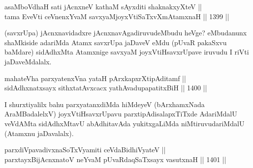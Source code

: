 
\begin{shl}
asaMboVdhaH sati jAcnxneV kathaM sAyxditi shaknakxyXteV || \\
tama EveVti ceV\footnotemark[3]nenxYvaM savxyaMjoyxVtiSaTxvXmAtamxnaH \hfill || 1399 ||  
\end{shl}

\begin{artha}
(savxrUpa) jAcnxnavidadxre jAcnxnavAgadiruvudeMbudu heVge? eMbudanunx shaMkiside adariMda Atamx savxrUpa jaDaveV eMdu (pUvaR pakaSxvu baMdare) sidAdhxMta Atamxnige savxyaM joyxVtiHsavxrUpave iruvudu I riVti jaDaveMdalalx.
\end{artha}

\begin{shl}
\footnotemark[4]mahateVha parxyatenxVna yataH pArxkapxrXtipAditamf ||  \\
sidAdhxnatxsayx sithxtatAvxcacx yathAvadupapatitxBiH \hfill || 1400 ||  
\end{shl}

\begin{artha}
I shurxtiyalilx bahu parxyatanxdiMda hiMdeyeV (bArxhamxNada AraMBadalelxV) joyxVtiHsavxrUpavu parxtipAdisalapxTiTxde AdariMdalU veVdAMta sidAdhxMtavU abAdhitavAda yukitxgaLiMda niMtiruvudariMdalU (Atamxnu jaDavalalx).
\end{artha}


\begin{shl}
parxdiVpavadivxnaSoTxV\s yamiti ceVdaBidhiVyateV || \\
parxtayxBijAcnxnatoV neYvaM pUvaRdaqSaTxsayx vasutxnaH \hfill || 1401 ||  
\end{shl}

